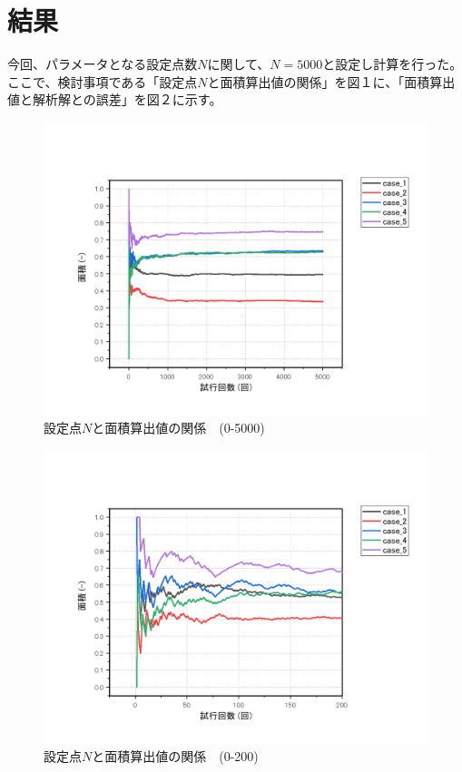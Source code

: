 \documentclass[12pt,a4paper]{jsarticle}
\begin{document}
\section{結果}
今回、パラメータとなる設定点数$N$に関して、$N=5000$と設定し計算を行った。\\
ここで、検討事項である「設定点$N$と面積算出値の関係」を図１に、「面積算出値と解析解との誤差」を図２に示す。
\begin{figure}[htbp]
    \begin{center}
        \includegraphics[width=150mm]{result_0-5000.png}
        \caption{設定点$N$と面積算出値の関係　(0-5000)}
    \end{center}
\end{figure}
\begin{figure}[htbp]
    \begin{center}
        \includegraphics[width=150mm]{result_0-200.png}
        \caption{設定点$N$と面積算出値の関係　(0-200)}
    \end{center}
\end{figure}
\end{document}
